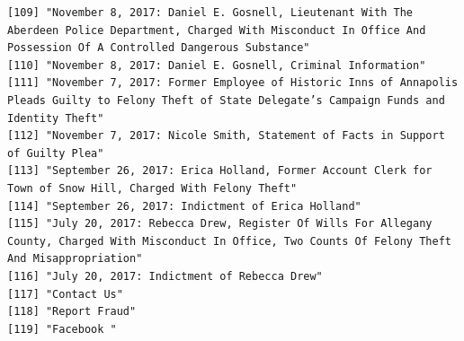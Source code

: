 \documentclass[
  letterpaper,
  DIV=11,
  numbers=noendperiod]{scrreprt}
\begin{document}
\begin{verbatim}
[109] "November 8, 2017: Daniel E. Gosnell, Lieutenant With The Aberdeen Police Department, Charged With Misconduct In Office And Possession Of A Controlled Dangerous Substance"                                                                           
[110] "November 8, 2017: Daniel E. Gosnell, Criminal Information"                                                                                                                                                                                           
[111] "November 7, 2017: Former Employee of Historic Inns of Annapolis Pleads Guilty to Felony Theft of State Delegate’s Campaign Funds and Identity Theft"                                                                                                 
[112] "November 7, 2017: Nicole Smith, Statement of Facts in Support of Guilty Plea"                                                                                                                                                                        
[113] "September 26, 2017: Erica Holland, Former Account Clerk for Town of Snow Hill, Charged With Felony Theft"                                                                                                                                            
[114] "September 26, 2017: Indictment of Erica Holland"                                                                                                                                                                                                     
[115] "July 20, 2017: Rebecca Drew, Register Of Wills For Allegany County, Charged With Misconduct In Office, Two Counts Of Felony Theft And Misappropriation"                                                                                              
[116] "July 20, 2017: Indictment of Rebecca Drew"                                                                                                                                                                                                           
[117] "Contact Us"                                                                                                                                                                                                                                          
[118] "Report Fraud"                                                                                                                                                                                                                                        
[119] "Facebook "                                                                                                                                                                                                                                           

\end{verbatim}
\end{document}
